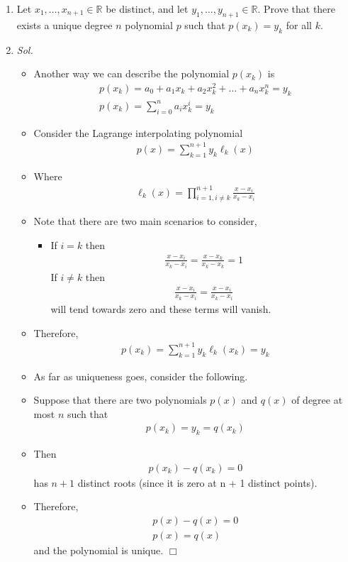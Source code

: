 \documentclass[11pt]{article}
\newcommand{\R}{\mathbb{R}}
\begin{document}
\begin{enumerate}
  \clearpage
	\item Let $x_1,\ldots,x_{n+1} \in \R$ be distinct, and let $y_1,\ldots,y_{n+1} \in \R$. Prove that there exists a unique degree $n$ polynomial $p$ such that $p(x_k) = y_k$ for all $k$.
  \item[] \textit{ Sol. }
    \begin{itemize}
      \item[] Another way we can describe the polynomial $p(x_k)$ is \begin{align*}
        p(x_k) = a_0 + a_1 x_k + a_2 x_k^2 + \ldots + a_n x_k^n = y_k \\
        p(x_k) = \sum_{i=0}^{n} a_i x_k^i = y_k
      \end{align*}
      \item[] Consider the Lagrange interpolating polynomial \begin{align*}
        p(x) = \sum_{k=1}^{n+1} y_k \ell_k(x)
      \end{align*}
    \item[] Where \begin{align*}
      \ell_k(x) = \prod_{i=1, i \neq k}^{n+1} \frac{x - x_i}{x_k - x_i}
    \end{align*}
  \item[] Note that there are two main scenarios to consider, \begin{itemize}
      \item[] If $i = k$ then \begin{align*}
        \frac{x - x_i}{x_k - x_i} = \frac{x - x_k}{x_k - x_k} = 1
      \end{align*}
      \itemp[] If $i \neq k$ then \begin{align*}
        \frac{x - x_i}{x_k - x_i} = \frac{x - x_i}{x_k - x_i}
      \end{align*} will tend towards zero and these terms will vanish. 
    \end{itemize}
  \item[] Therefore, \begin{align*}
      p(x_k) = \sum_{k=1}^{n+1} y_k \ell_k(x_k) = y_k
    \end{align*}
\item[] As far as uniqueness goes, consider the following.
  \item[] Suppose that there are two polynomials $p(x)$ and $q(x)$ of degree at most $n$ such that \begin{align*}
    p(x_k) = y_k = q(x_k)
  \end{align*}
\item[] Then \begin{align*}
    p(x_k) - q(x_k) = 0
  \end{align*} has $n+1$ distinct roots (since it is zero at n + 1 distinct points). 
\item[] Therefore, \begin{align*}
    p(x) - q(x) = 0\\
    p(x) = q(x)
  \end{align*} and the polynomial is unique. $\Box$


\end{itemize}
\end{enumerate}
\end{document}
